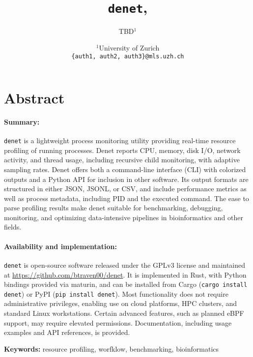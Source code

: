 \documentclass[10pt]{article}
\title{\texttt{denet},}
\author{TBD$^1$}
\date{
	$^1$University of Zurich \\ \texttt{\{auth1, auth2, auth3\}@mls.uzh.ch}\\%
}
\begin{document}
\maketitle
	
\section{Abstract} %

\paragraph{Summary:} \texttt{denet} is a lightweight process monitoring utility providing real-time resource profiling of running processes. Denet reports CPU, memory, disk I/O, network activity, and thread usage, including recursive child monitoring, with adaptive sampling rates. Denet offers both a command-line interface (CLI) with colorized outputs and a Python API for inclusion in other software. Its output formats are structured in either JSON, JSONL, or CSV, and include performance metrics as well as process metadata, including PID and the executed command. The ease to parse profiling results make denet suitable for benchmarking, debugging, monitoring, and optimizing data-intensive pipelines in bioinformatics and other fields. 

\paragraph{Availability and implementation:} \texttt{denet} is open-source software released under the GPLv3 license and maintained at \url{https://github.com/btraven00/denet}. It is implemented in Rust, with Python bindings provided via maturin, and can be installed from Cargo (\texttt{cargo install denet}) or PyPI (\texttt{pip install denet}). Most functionality does not require administrative privileges, enabling use on cloud platforms, HPC clusters, and standard Linux workstations. Certain advanced features, such as planned eBPF support, may require elevated permissions. Documentation, including usage examples and API references, is provided.

\vspace{1cm}

\noindent\textbf{Keywords:} resource profiling, worfklow, benchmarking, bioinformatics

\clearpage
\end{document}
